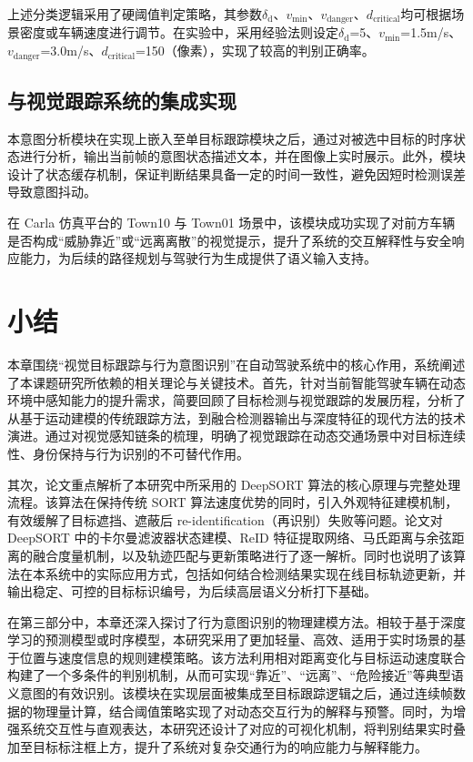 上述分类逻辑采用了硬阈值判定策略，其参数$\delta_{\mathrm{d}}$、$v_{\text{min}}$、$v_{\text{danger}}$、$d_{\text{critical}}$均可根据场景密度或车辆速度进行调节。在实验中，采用经验法则设定$\delta_{\mathrm{d}}$=5、$v_{\text{min}}$=1.5m/s、$v_{\text{danger}}$=3.0m/s、$d_{\text{critical}}$=150（像素），实现了较高的判别正确率。

\subsection{与视觉跟踪系统的集成实现}

本意图分析模块在实现上嵌入至单目标跟踪模块之后，通过对被选中目标的时序状态进行分析，输出当前帧的意图状态描述文本，并在图像上实时展示。此外，模块设计了状态缓存机制，保证判断结果具备一定的时间一致性，避免因短时检测误差导致意图抖动。

在 Carla 仿真平台的 Town10 与 Town01 场景中，该模块成功实现了对前方车辆是否构成“威胁靠近”或“远离离散”的视觉提示，提升了系统的交互解释性与安全响应能力，为后续的路径规划与驾驶行为生成提供了语义输入支持。

\section{小结}
本章围绕“视觉目标跟踪与行为意图识别”在自动驾驶系统中的核心作用，系统阐述了本课题研究所依赖的相关理论与关键技术。首先，针对当前智能驾驶车辆在动态环境中感知能力的提升需求，简要回顾了目标检测与视觉跟踪的发展历程，分析了从基于运动建模的传统跟踪方法，到融合检测器输出与深度特征的现代方法的技术演进。通过对视觉感知链条的梳理，明确了视觉跟踪在动态交通场景中对目标连续性、身份保持与行为识别的不可替代作用。

其次，论文重点解析了本研究中所采用的 DeepSORT 算法的核心原理与完整处理流程。该算法在保持传统 SORT 算法速度优势的同时，引入外观特征建模机制，有效缓解了目标遮挡、遮蔽后 re-identification（再识别）失败等问题。论文对 DeepSORT 中的卡尔曼滤波器状态建模、ReID 特征提取网络、马氏距离与余弦距离的融合度量机制，以及轨迹匹配与更新策略进行了逐一解析。同时也说明了该算法在本系统中的实际应用方式，包括如何结合检测结果实现在线目标轨迹更新，并输出稳定、可控的目标标识编号，为后续高层语义分析打下基础。

在第三部分中，本章还深入探讨了行为意图识别的物理建模方法。相较于基于深度学习的预测模型或时序模型，本研究采用了更加轻量、高效、适用于实时场景的基于位置与速度信息的规则建模策略。该方法利用相对距离变化与目标运动速度联合构建了一个多条件的判别机制，从而可实现“靠近”、“远离”、“危险接近”等典型语义意图的有效识别。该模块在实现层面被集成至目标跟踪逻辑之后，通过连续帧数据的物理量计算，结合阈值策略实现了对动态交互行为的解释与预警。同时，为增强系统交互性与直观表达，本研究还设计了对应的可视化机制，将判别结果实时叠加至目标标注框上方，提升了系统对复杂交通行为的响应能力与解释能力。

